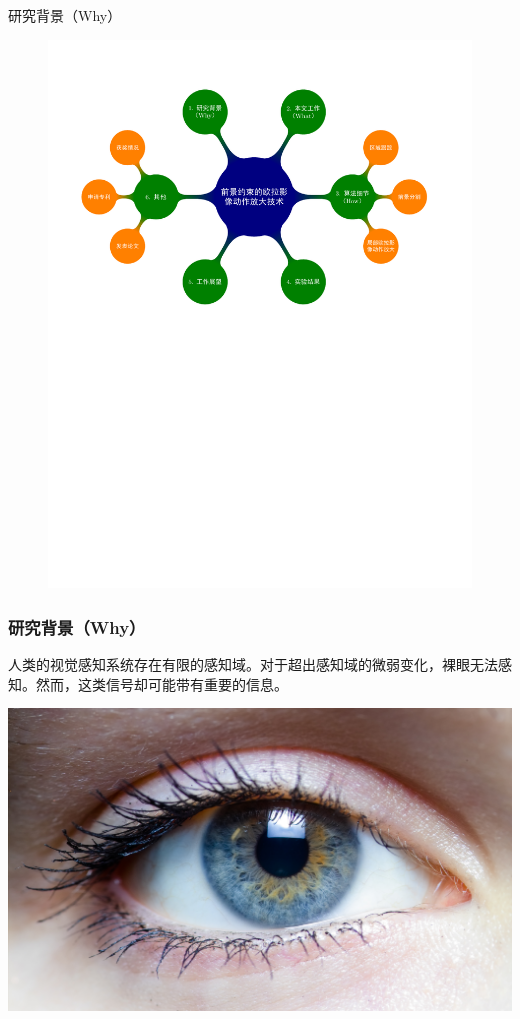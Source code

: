 \documentclass[xcolor=svgnames,serif,table]{beamer}
\begin{document}
\begin{frame}{研究背景（Why）}
  \vspace{-2.5em}
  \begin{figure}
    \centering
    \includegraphics[width=\textwidth, page=2]{mindmap.pdf}
  \end{figure}
\end{frame}

\begin{frame}
  \frametitle{研究背景（Why）}
  人类的视觉感知系统存在有限的感知域。对于超出感知域的微弱变化，裸眼无法感知。然而，这类信号却可能带有重要的信息。
  \begin{center}
    \includegraphics[width=.5\textwidth]{eye.jpg}
  \end{center}
\end{frame}
\end{document}
